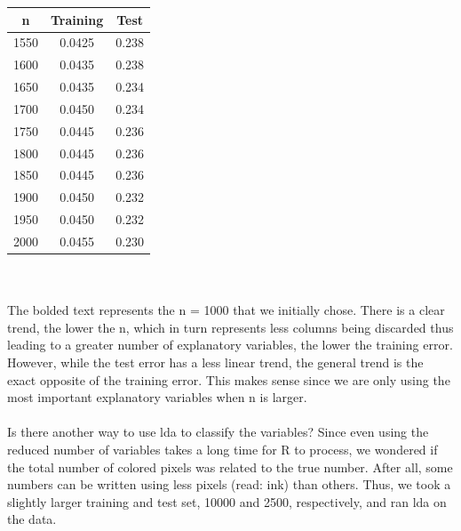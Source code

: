 \documentclass[10pt]{extarticle}
\begin{document}
\begin{minipage}{.25\textwidth}
	\begin{tabular}{c c c}
		n & Training & Test\\ \hline
		1550&0.0425&0.238\\
		1600&0.0435&0.238\\
		1650&0.0435&0.234\\
		1700&0.0450&0.234\\
		1750&0.0445&0.236\\
		1800&0.0445&0.236\\
		1850&0.0445&0.236\\
		1900&0.0450&0.232\\
		1950&0.0450&0.232\\
		2000&0.0455&0.230
	\end{tabular}
\end{minipage}\\\\
The bolded text represents the n = 1000 that we initially chose. There is a clear trend, the lower the n, which in turn represents less columns being discarded thus leading to a greater number of explanatory variables, the lower the training error. However, while the test error has a less linear trend, the general trend is the exact opposite of the training error. This makes sense since we are only using the most important explanatory variables when n is larger.\\\\
Is there another way to use lda to classify the variables? Since even using the reduced number of variables takes a long time for R to process, we wondered if the total number of colored pixels was related to the true number. After all, some numbers can be written using less pixels (read: ink) than others. Thus, we took a slightly larger training and test set, 10000 and 2500, respectively, and ran lda on the data.\\\\
\end{document}
